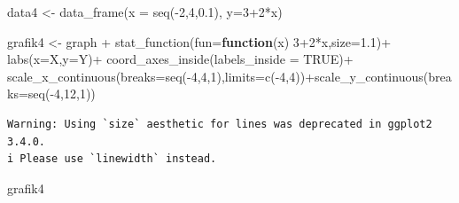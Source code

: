 \documentclass[
  letterpaper,
  DIV=11,
  numbers=noendperiod]{scrartcl}
\newenvironment{Shaded}{\begin{snugshade}}{\end{snugshade}}
\newcommand{\AttributeTok}[1]{\textcolor[rgb]{0.40,0.45,0.13}{#1}}
\newcommand{\ConstantTok}[1]{\textcolor[rgb]{0.56,0.35,0.01}{#1}}
\newcommand{\ControlFlowTok}[1]{\textcolor[rgb]{0.00,0.23,0.31}{\textbf{#1}}}
\newcommand{\DecValTok}[1]{\textcolor[rgb]{0.68,0.00,0.00}{#1}}
\newcommand{\FloatTok}[1]{\textcolor[rgb]{0.68,0.00,0.00}{#1}}
\newcommand{\FunctionTok}[1]{\textcolor[rgb]{0.28,0.35,0.67}{#1}}
\newcommand{\NormalTok}[1]{\textcolor[rgb]{0.00,0.23,0.31}{#1}}
\newcommand{\OtherTok}[1]{\textcolor[rgb]{0.00,0.23,0.31}{#1}}
\newcommand{\SpecialCharTok}[1]{\textcolor[rgb]{0.37,0.37,0.37}{#1}}
\newcommand{\StringTok}[1]{\textcolor[rgb]{0.13,0.47,0.30}{#1}}
\begin{document}
\begin{Shaded}
\begin{Highlighting}[]
\NormalTok{data4 }\OtherTok{\textless{}{-}} \FunctionTok{data\_frame}\NormalTok{(}\AttributeTok{x =} \FunctionTok{seq}\NormalTok{(}\SpecialCharTok{{-}}\DecValTok{2}\NormalTok{,}\DecValTok{4}\NormalTok{,}\FloatTok{0.1}\NormalTok{),}
                    \AttributeTok{y=}\DecValTok{3}\SpecialCharTok{+}\DecValTok{2}\SpecialCharTok{*}\NormalTok{x)}
                          
\NormalTok{grafik4 }\OtherTok{\textless{}{-}}\NormalTok{ graph }\SpecialCharTok{+}
  \FunctionTok{stat\_function}\NormalTok{(}\AttributeTok{fun=}\ControlFlowTok{function}\NormalTok{(x) }\DecValTok{3}\SpecialCharTok{+}\DecValTok{2}\SpecialCharTok{*}\NormalTok{x,}\AttributeTok{size=}\FloatTok{1.1}\NormalTok{)}\SpecialCharTok{+}
  \FunctionTok{labs}\NormalTok{(}\AttributeTok{x=}\StringTok{\textquotesingle{}X\textquotesingle{}}\NormalTok{,}\AttributeTok{y=}\StringTok{\textquotesingle{}Y\textquotesingle{}}\NormalTok{)}\SpecialCharTok{+}
  \FunctionTok{coord\_axes\_inside}\NormalTok{(}\AttributeTok{labels\_inside =} \ConstantTok{TRUE}\NormalTok{)}\SpecialCharTok{+}
  \FunctionTok{scale\_x\_continuous}\NormalTok{(}\AttributeTok{breaks=}\FunctionTok{seq}\NormalTok{(}\SpecialCharTok{{-}}\DecValTok{4}\NormalTok{,}\DecValTok{4}\NormalTok{,}\DecValTok{1}\NormalTok{),}\AttributeTok{limits=}\FunctionTok{c}\NormalTok{(}\SpecialCharTok{{-}}\DecValTok{4}\NormalTok{,}\DecValTok{4}\NormalTok{))}\SpecialCharTok{+}\FunctionTok{scale\_y\_continuous}\NormalTok{(}\AttributeTok{breaks=}\FunctionTok{seq}\NormalTok{(}\SpecialCharTok{{-}}\DecValTok{4}\NormalTok{,}\DecValTok{12}\NormalTok{,}\DecValTok{1}\NormalTok{))}
\end{Highlighting}
\end{Shaded}

\begin{verbatim}
Warning: Using `size` aesthetic for lines was deprecated in ggplot2 3.4.0.
i Please use `linewidth` instead.
\end{verbatim}

\begin{Shaded}
\begin{Highlighting}[]
\NormalTok{grafik4}
\end{Highlighting}
\end{Shaded}
\end{document}
